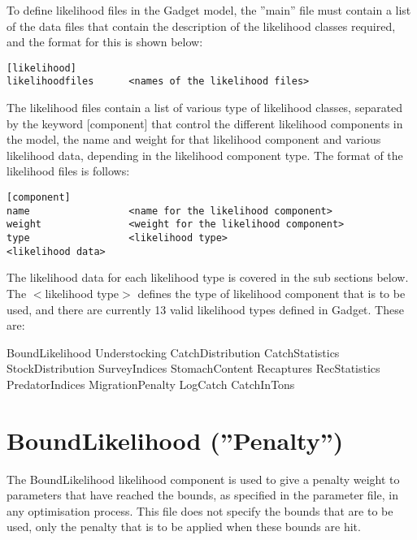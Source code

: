 \documentclass [a4paper, 10pt]{book}
\begin{document}
\bigskip
To define likelihood files in the Gadget model, the ''main'' file must contain a list of the data files that contain the description of the likelihood classes required, and the format for this is shown below:

{\small\begin{verbatim}
[likelihood]
likelihoodfiles      <names of the likelihood files>
\end{verbatim}}

The likelihood files contain a list of various type of likelihood classes, separated by the keyword [component] that control the different likelihood components in the model, the name and weight for that likelihood component and various likelihood data, depending in the likelihood component type.  The format of the likelihood files is follows:

{\small\begin{verbatim}
[component]
name                 <name for the likelihood component>
weight               <weight for the likelihood component>
type                 <likelihood type>
<likelihood data>
\end{verbatim}}

The likelihood data for each likelihood type is covered in the sub sections below.  The $<$likelihood type$>$ defines the type of likelihood component that is to be used, and there are currently 13 valid likelihood types defined in Gadget.  These are:

\bigskip
BoundLikelihood\newline
Understocking\newline
CatchDistribution\newline
CatchStatistics\newline
StockDistribution\newline
SurveyIndices\newline
StomachContent\newline
Recaptures\newline
RecStatistics\newline
PredatorIndices\newline
MigrationPenalty\newline
LogCatch\newline
CatchInTons

\section{BoundLikelihood (''Penalty'')}\label{sec:boundlike}
The BoundLikelihood likelihood component is used to give a penalty weight to parameters that have reached the bounds, as specified in the parameter file, in any optimisation process.  This file does not specify the bounds that are to be used, only the penalty that is to be applied when these bounds are hit.
\end{document}
